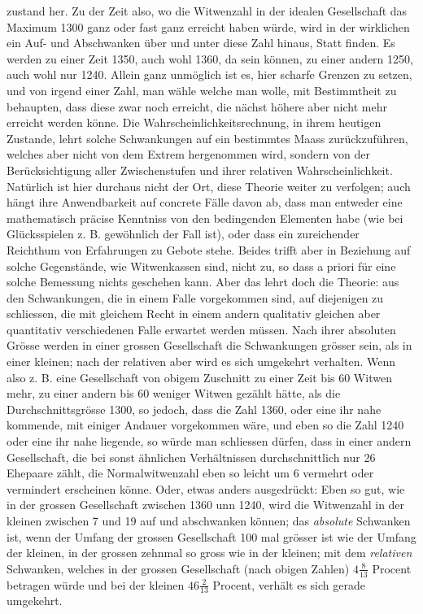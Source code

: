 %
zustand her. Zu der Zeit also, wo die Witwenzahl in der idealen Gesellschaft das Maximum 1300 ganz oder fast ganz erreicht haben würde, wird in der wirklichen ein Auf- und Abschwanken über und unter diese Zahl hinaus, Statt finden. Es werden zu einer Zeit 1350, auch wohl 1360, da sein können, zu einer andern 1250, auch wohl nur 1240. Allein ganz unmöglich ist es, hier scharfe Grenzen zu setzen, und von irgend einer Zahl, man wähle welche man wolle, mit Bestimmtheit zu behaupten, dass diese zwar noch erreicht, die nächst höhere aber nicht mehr erreicht werden könne. Die Wahrscheinlichkeitsrechnung, in ihrem heutigen Zustande, lehrt solche Schwankungen auf ein bestimmtes Maass zurückzuführen, welches aber nicht von dem Extrem hergenommen wird, sondern von der Berücksichtigung aller Zwischenstufen und ihrer relativen Wahrscheinlichkeit. Natürlich ist hier durchaus nicht der Ort, diese Theorie weiter zu verfolgen; auch hängt ihre Anwendbarkeit auf concrete Fälle davon ab, dass man entweder eine mathematisch präcise Kenntniss von den bedingenden Elementen habe (wie bei Glücksspielen z. B. gewöhnlich der Fall ist), oder dass ein zureichender Reichthum von Erfahrungen zu Gebote stehe. Beides trifft aber in Beziehung auf solche Gegenstände, wie Witwenkassen sind, nicht zu, so dass a priori für eine solche Bemessung nichts geschehen kann. Aber das lehrt doch die Theorie: aus den Schwankungen, die in einem Falle vorgekommen sind, auf diejenigen zu schliessen, die mit gleichem Recht in einem andern qualitativ gleichen aber quantitativ verschiedenen Falle erwartet werden müssen. Nach ihrer absoluten Grösse werden in einer grossen Gesellschaft die Schwankungen grösser sein, als in einer kleinen; nach der relativen aber wird es sich umgekehrt verhalten. Wenn also z. B. eine Gesellschaft von obigem Zuschnitt zu einer Zeit bis 60 Witwen mehr, zu einer andern bis 60 weniger Witwen gezählt hätte, als die Durchschnittsgrösse 1300, so jedoch, dass die Zahl 1360, oder eine ihr nahe kommende, mit einiger Andauer vorgekommen wäre, und eben so die Zahl 1240 oder eine ihr nahe liegende, so würde man schliessen dürfen, dass in einer andern Gesellschaft, die bei sonst ähnlichen Verhältnissen durchschnittlich nur 26 Ehepaare zählt, die Normalwitwenzahl eben so leicht um 6 vermehrt oder vermindert erscheinen könne. Oder, etwas anders ausgedrückt: Eben so gut, wie in der grossen Gesellschaft zwischen 1360 unn 1240, wird die Witwenzahl in der kleinen zwischen 7 und 19 auf und abschwanken können; das \textit{absolute} Schwanken ist, wenn der Umfang der grossen Gesellschaft 100 mal grösser ist wie der Umfang der kleinen, in der grossen zehnmal so gross wie in der kleinen; mit dem \textit{relativen} Schwanken, welches in der grossen Gesellschaft (nach obigen Zahlen) \(4\tfrac8{13}\) Procent betragen würde und bei der kleinen \(46\tfrac2{13}\) Procent, verhält es sich gerade umgekehrt.

